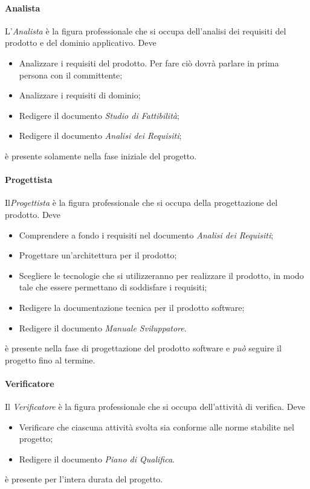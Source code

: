 		\paragraph{Analista} \Spazio
		L'\emph{Analista} è la figura professionale che si occupa dell'analisi dei requisiti del prodotto e del dominio applicativo. Deve
		\begin{itemize}
			\item Analizzare i requisiti del prodotto. Per fare ciò dovrà parlare in prima persona con il committente;
			\item Analizzare i requisiti di dominio;
			\item Redigere il documento \emph{Studio di Fattibilità};
			\item Redigere il documento \emph{Analisi dei Requisiti};
		\end{itemize}
		è presente solamente nella fase iniziale del progetto.
		\paragraph{Progettista} \Spazio
		Il\emph{Progettista} è la figura professionale che si occupa della progettazione del prodotto. Deve
		\begin{itemize}
			\item Comprendere a fondo i requisiti nel documento \emph{Analisi dei Requisiti};
			\item Progettare un'architettura per il prodotto;
			\item Scegliere le tecnologie che si utilizzeranno per realizzare il prodotto, in modo tale che essere permettano di soddisfare i requisiti;
			\item Redigere la documentazione tecnica per il prodotto software;
			\item Redigere il documento \emph{Manuale Sviluppatore}.
		\end{itemize}
		è presente nella fase di progettazione del prodotto software e \emph{può} seguire il progetto fino al termine.
		\paragraph{Verificatore} \Spazio
		Il \emph{Verificatore} è la figura professionale che si occupa dell'attività di verifica. Deve
		\begin{itemize}
			\item Verificare che ciascuna attività svolta sia conforme alle norme stabilite nel progetto;
			\item Redigere il documento \emph{Piano di Qualifica}.
		\end{itemize}
		è presente per l'intera durata del progetto.
